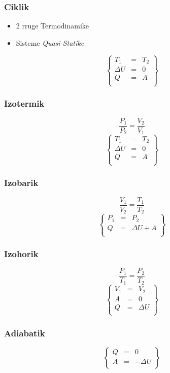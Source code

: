 \documentclass[a4paper, twocolumn]{article}
\begin{document}
\subsubsection{Ciklik}
\begin{itemize}
	\item 2 rruge Termodinamike
	\item Sisteme \emph{Quasi-Statike}
\end{itemize}
\[
\begin{Bmatrix}
T_{1}&=& T_{2} \\
\Delta U &=& 0 \\
Q &=& A \\
\end{Bmatrix}
\]
\endgroup
\subsubsection{Izotermik}
 \[
\frac{P_{1}}{P_{2}} = \frac{V_{2}}{V_{1}}
\]
\[
\begin{Bmatrix}
T_{1}&=&T_{2} \\
\Delta U &=& 0 \\
Q &= &A \\
\end{Bmatrix}
\]
\subsubsection{Izobarik}
\[
\frac{V_{1}}{V_{2}} = \frac{T_{1}}{T_{2}}
\]
\[
\begin{Bmatrix}
P_{1}&= &P_{2} \\
Q&=&\Delta U + A\\
\end{Bmatrix}
\]
\subsubsection{Izohorik}
\[
\frac{P_{1}}{T_{1}} = \frac{P_{2}}{T_{2}}
\]
\[
\begin{Bmatrix}
V_{1}&=& V_{2} \\
A&=&0\\
Q&=&\Delta U\\
\end{Bmatrix}
\]
\subsubsection{Adiabatik}
\[
\begin{Bmatrix}
Q&=&0\\
A&=&-\Delta U\\
\end{Bmatrix}
\]
\end{document}
